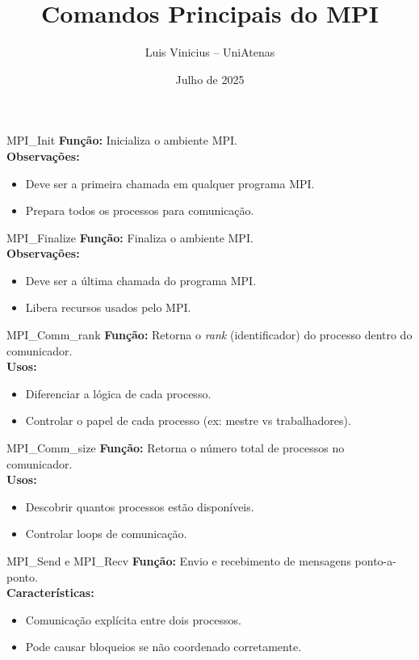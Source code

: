 \documentclass{beamer}
\title{Comandos Principais do MPI}
\author{Luis Vinicius -- UniAtenas}
\date{Julho de 2025}
\begin{document}
\frame{\titlepage}

\begin{frame}{MPI\_Init}
\textbf{Função:} Inicializa o ambiente MPI. \\
\textbf{Observações:}
\begin{itemize}
    \item Deve ser a primeira chamada em qualquer programa MPI.
    \item Prepara todos os processos para comunicação.
\end{itemize}
\end{frame}

\begin{frame}{MPI\_Finalize}
\textbf{Função:} Finaliza o ambiente MPI. \\
\textbf{Observações:}
\begin{itemize}
    \item Deve ser a última chamada do programa MPI.
    \item Libera recursos usados pelo MPI.
\end{itemize}
\end{frame}

\begin{frame}{MPI\_Comm\_rank}
\textbf{Função:} Retorna o \textit{rank} (identificador) do processo dentro do comunicador. \\
\textbf{Usos:}
\begin{itemize}
    \item Diferenciar a lógica de cada processo.
    \item Controlar o papel de cada processo (ex: mestre vs trabalhadores).
\end{itemize}
\end{frame}

\begin{frame}{MPI\_Comm\_size}
\textbf{Função:} Retorna o número total de processos no comunicador. \\
\textbf{Usos:}
\begin{itemize}
    \item Descobrir quantos processos estão disponíveis.
    \item Controlar loops de comunicação.
\end{itemize}
\end{frame}

\begin{frame}{MPI\_Send e MPI\_Recv}
\textbf{Função:} Envio e recebimento de mensagens ponto-a-ponto. \\
\textbf{Características:}
\begin{itemize}
    \item Comunicação explícita entre dois processos.
    \item Pode causar bloqueios se não coordenado corretamente.
\end{itemize}
\end{frame}
\end{document}

